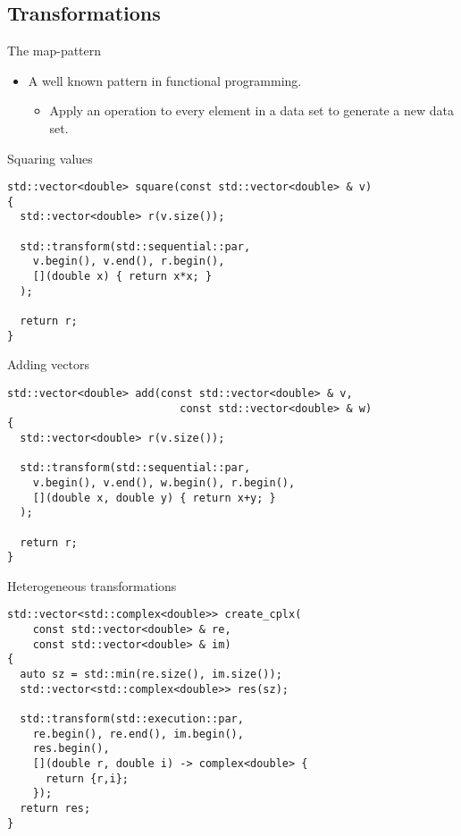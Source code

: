 \subsection{Transformations}

\begin{frame}[t]{The map-pattern}
\begin{itemize}
  \item A well known pattern in functional programming.
    \begin{itemize}
      \item Apply an operation to every element in a data set
            to generate a new data set.
    \end{itemize}
\end{itemize}
\end{frame}

\begin{frame}[t,fragile]{Squaring values}
\begin{lstlisting}
std::vector<double> square(const std::vector<double> & v) 
{
  std::vector<double> r(v.size());

  std::transform(std::sequential::par,
    v.begin(), v.end(), r.begin(),
    [](double x) { return x*x; }
  );

  return r;
}
\end{lstlisting}
\end{frame}

\begin{frame}[t,fragile]{Adding vectors}
\begin{lstlisting}
std::vector<double> add(const std::vector<double> & v,
                           const std::vector<double> & w) 
{
  std::vector<double> r(v.size());

  std::transform(std::sequential::par,
    v.begin(), v.end(), w.begin(), r.begin(),
    [](double x, double y) { return x+y; }
  );

  return r;
}
\end{lstlisting}
\end{frame}

\begin{frame}[t,fragile]{Heterogeneous transformations}
\begin{lstlisting}
std::vector<std::complex<double>> create_cplx(
    const std::vector<double> & re,
    const std::vector<double> & im)
{
  auto sz = std::min(re.size(), im.size());
  std::vector<std::complex<double>> res(sz);
  
  std::transform(std::execution::par,
    re.begin(), re.end(), im.begin(),
    res.begin(),
    [](double r, double i) -> complex<double> {
      return {r,i};
    });
  return res;
}
\end{lstlisting}
\end{frame}

